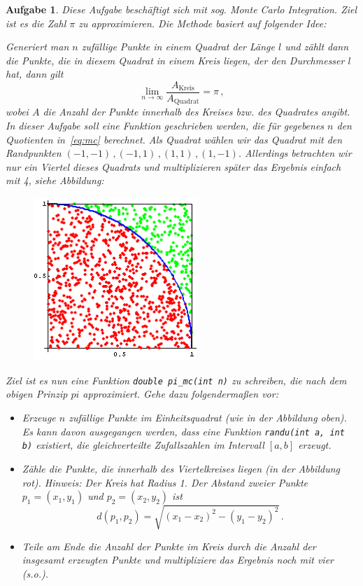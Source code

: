 \documentclass[a4paper,12pt,parskip=full]{scrartcl}
\theoremstyle{exercise}
\newtheorem{exercise}{Aufgabe}
\begin{document}
\begin{exercise}
  Diese Aufgabe beschäftigt sich mit sog. \emph{Monte Carlo Integration}. Ziel ist es
  die Zahl $\pi$ zu approximieren. Die Methode basiert auf folgender Idee:

  Generiert man $n$ zufällige Punkte in einem Quadrat der Länge $l$ und zählt dann die Punkte,
  die in diesem Quadrat in einem Kreis liegen, der den Durchmesser $l$ hat, dann gilt
  \begin{equation}
    \label{eq:mc}
    \lim_{n \rightarrow \infty} \frac{A_{\text{Kreis}}}{A_{\text{Quadrat}}} = \pi\,,
  \end{equation}
  wobei $A$ die Anzahl der Punkte innerhalb des Kreises bzw. des Quadrates angibt.
  In dieser Aufgabe soll eine Funktion geschrieben werden, die für gegebenes $n$ den
  Quotienten in~\eqref{eq:mc} berechnet. Als Quadrat wählen wir das Quadrat mit den
  Randpunkten $(-1,-1)\,,(-1,1)\,, (1,1)\,, (1,-1)$. Allerdings betrachten wir nur ein
  Viertel dieses Quadrats und multiplizieren später das Ergebnis einfach mit 4, siehe Abbildung:
  \begin{figure}[H]
    \centering
    \includegraphics[width=0.55\textwidth]{montecarlo.png}
  \end{figure}
  Ziel ist es nun eine Funktion \lstinline|double pi_mc(int n)| zu schreiben, die nach dem
  obigen Prinzip $pi$ approximiert. Gehe dazu folgendermaßen vor:
  \begin{itemize}
  \item Erzeuge $n$ zufällige Punkte im Einheitsquadrat (wie in der Abbildung oben).
    Es kann davon ausgegangen werden, dass eine Funktion \lstinline|randu(int a, int b)|
    existiert, die gleichverteilte Zufallszahlen im Intervall $[a,b]$ erzeugt.
  \item Zähle die Punkte, die innerhalb des Viertelkreises liegen (in der Abbildung rot). Hinweis:
    Der Kreis hat Radius 1. Der Abstand zweier Punkte $p_1 = (x_1, y_1)$ und $p_2 = (x_2, y_2)$ ist
    \[
      d(p_1, p_2) = \sqrt{{(x_1 - x_2)}^2 - {(y_1 - y_2)}^2}\,.
    \]
  \item Teile am Ende die Anzahl der Punkte im Kreis durch die Anzahl der insgesamt
    erzeugten Punkte und multipliziere das Ergebnis noch mit vier (s.o.).
  \end{itemize}
  
\end{exercise}
\end{document}
